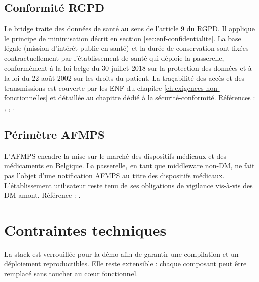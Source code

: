 \subsection{Conformité RGPD}
\label{subsec:rgpd}

Le bridge traite des données de santé au sens de l'article 9 du RGPD. Il applique le principe de minimisation décrit en section \ref{sec:enf-confidentialite}. La base légale (mission d'intérêt public en santé) et la durée de conservation sont fixées contractuellement par l'établissement de santé qui déploie la passerelle, conformément à la loi belge du 30 juillet 2018 sur la protection des données et à la loi du 22 août 2002 sur les droits du patient. La traçabilité des accès et des transmissions est couverte par les ENF du chapitre \ref{ch:exigences-non-fonctionnelles} et détaillée au chapitre dédié à la sécurité-conformité. Références : \cite{rgpd_2016_679}, \cite{loi_protection_donnees_2018}, \cite{loi_droits_patient_2002}.

\subsection{Périmètre AFMPS}
\label{subsec:afmps}

L'AFMPS encadre la mise sur le marché des dispositifs médicaux et des médicaments en Belgique. La passerelle, en tant que middleware non-DM, ne fait pas l'objet d'une notification AFMPS au titre des dispositifs médicaux. L'établissement utilisateur reste tenu de ses obligations de vigilance vis-à-vis des DM amont. Référence : \cite{afmps}.

\section{Contraintes techniques}
\label{sec:contraintes-techniques}

La stack est verrouillée pour la démo afin de garantir une compilation et un déploiement reproductibles. Elle reste extensible : chaque composant peut être remplacé sans toucher au cœur fonctionnel.

